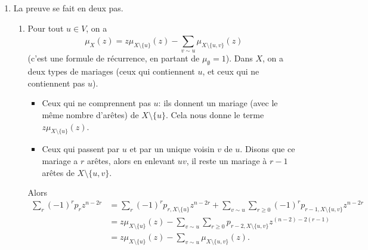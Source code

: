 \begin{preuve}[de la Proposition]
\begin{enumerate}
    
  \item La preuve se fait en deux pas.
    \begin{enumerate}
    \item Pour tout $u \in V$, on a 
      \begin{equation}
        \label{eq:1}
        \mu_X(z) = z\mu_{X \setminus \{u\}}(z) - \sum_{v \sim u}^{}\mu_{X \setminus \{u, v\}}(z)
      \end{equation}
      (c'est une formule de récurrence, en partant de $\mu_\emptyset = 1$). Dans $X$, on a deux types de
      mariages (ceux qui contiennent $u$, et ceux qui ne contiennent pas $u$).
      \begin{itemize}
      \item Ceux qui ne comprennent pas $u$: ils donnent un mariage (avec le même nombre d'arêtes) de $X
        \setminus \{u\}$. Cela nous donne le terme $z \mu_{X \setminus \{u\}}(z)$.
      \item Ceux qui passent par $u$ et par un unique voisin $v$ de $u$. Disons que ce mariage a $r$ arêtes,
        alors en enlevant $uv$, il reste un mariage à $r-1$ arêtes de $X \setminus \{u, v\}$.
      \end{itemize}
      Alors 
      \begin{align*}
        \sum_{r}^{}(-1)^r p_r z^{n - 2r}
        &= \sum_{r}^{} (-1)^r p_{r, X \setminus \{u\}} z^{n - 2r} + \sum_{v
          \sim u}^{} \sum_{r \geq 0}^{} (-1)^r p_{r-1, X \setminus \{u,v\}} z^{n-2r}\\
        &= z \mu_{X \setminus \{u\}}(z) - \sum_{v \sim u}^{} \sum_{r \geq 0}^{} p_{r-2, X \setminus \{u,
          v\}}z^{(n-2)-2(r-1)}\\
        &= z \mu_{X \setminus \{u\}}(z) - \sum_{v \sim u}^{} \mu_{X \setminus \{u, v\}}(z).
        \end{align*}
    \end{enumerate}

  \end{enumerate}
\end{preuve}





































